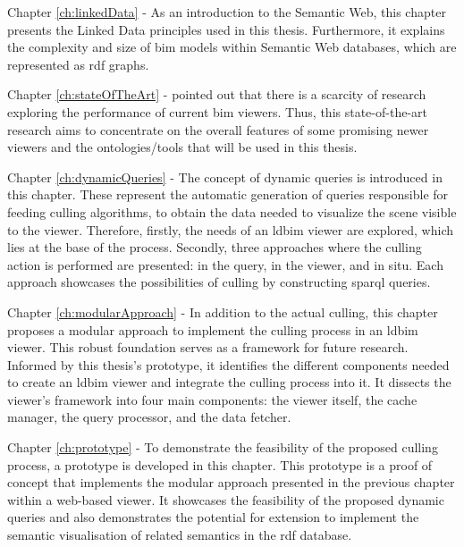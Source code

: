 \begin{refsection}
\begin{multicols}{2}
        \textsf{Chapter \ref{ch:linkedData} -}
        As an introduction to the Semantic Web, this chapter presents the Linked Data principles used in this thesis. Furthermore, it explains the complexity and size of \ac{bim} models within Semantic Web databases, which are represented as \ac{rdf} graphs.

        \textsf{Chapter \ref{ch:stateOfTheArt} -}
        \cite{Johansson2015} pointed out that there is a scarcity of research exploring the performance of current \ac{bim} viewers. Thus, this state-of-the-art research aims to concentrate on the overall features of some promising newer viewers and the ontologies/tools that will be used in this thesis.

        \textsf{Chapter \ref{ch:dynamicQueries} -}
        The concept of dynamic queries is introduced in this chapter. These represent the automatic generation of queries responsible for feeding culling algorithms, to obtain the data needed to visualize the scene visible to the viewer. Therefore, firstly, the needs of an \ac{ldbim} viewer are explored, which lies at the base of the process. Secondly, three approaches where the culling action is performed are presented: in the query, in the viewer, and in situ. Each approach showcases the possibilities of culling by constructing \ac{sparql} queries.

        \textsf{Chapter \ref{ch:modularApproach} -}
        In addition to the actual culling, this chapter proposes a modular approach to implement the culling process in an \ac{ldbim} viewer. This robust foundation serves as a framework for future research. Informed by this thesis's prototype, it identifies the different components needed to create an \ac{ldbim} viewer and integrate the culling process into it. It dissects the viewer's framework into four main components: the viewer itself, the cache manager, the query processor, and the data fetcher.

        \textsf{Chapter \ref{ch:prototype} -}
        To demonstrate the feasibility of the proposed culling process, a prototype is developed in this chapter. This prototype is a proof of concept that implements the modular approach presented in the previous chapter within a web-based viewer. It showcases the feasibility of the proposed dynamic queries and also demonstrates the potential for extension to implement the semantic visualisation of related semantics in the \ac{rdf} database.


\end{multicols}
\end{refsection}
